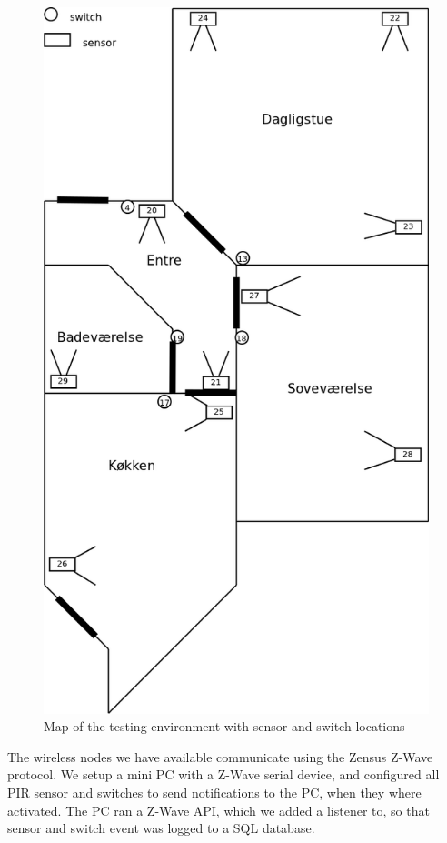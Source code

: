 \begin{figure}[htbp]
\centering
\includegraphics[keepaspectratio,width=\textwidth,height=0.75\textheight]{figures/hellebaekgade3.png}
\caption{Map of the testing environment with sensor and switch locations}
\label{hellebaekgade}
\end{figure}



The wireless nodes we have available communicate using the Zensus Z-Wave protocol. We setup a mini PC with a Z-Wave serial device, and configured all PIR sensor and switches to send notifications to the PC, when they where activated. The PC ran a Z-Wave API, which we added a listener to, so that sensor and switch event was logged to a SQL database.

